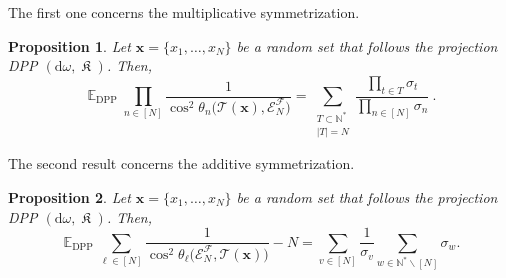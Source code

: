 \documentclass[twoside,11pt]{book}
\newtheorem{proposition}{Proposition}
\numberwithin{theorem}{chapter}
\numberwithin{definition}{chapter}
\numberwithin{proposition}{chapter}
\numberwithin{corollary}{chapter}
\numberwithin{example}{chapter}
\numberwithin{lemma}{chapter}
\numberwithin{assumption}{chapter}
\DeclareMathOperator{\Det}{Det}
\DeclareMathOperator{\DPP}{\mathrm{DPP}}
\DeclareMathOperator{\EX}{\mathbb{E}}
\DeclareMathOperator*{\KDPP}{\mathfrak{K}}
\begin{document}

The first one concerns the multiplicative symmetrization.
\begin{proposition}\label{prop:expected_value_of_product_of_cos}
Let $\bm{x} = \{x_{1}, \dots , x_{N}\}$ be a random set that follows the projection DPP $(\mathrm{d}\omega, \KDPP )$. Then,
\begin{equation}\label{eq:expected_value_of_product_of_cos}
\EX_{\DPP} \prod\limits_{n \in [N]} \frac{1}{\cos^{2} \theta_{n}\bigg(\mathcal{T}(\bm{x}), \mathcal{E}^{\mathcal{F}}_{N} \bigg)}   = \sum\limits_{\substack{T \subset \mathbb{N}^{*} \\ |T| = N}} \frac{ \prod\limits_{t \in T}\sigma_{t}}{\prod\limits_{n \in [N]} \sigma_{n}} \:.
\end{equation}
\end{proposition}

The second result concerns the additive symmetrization.

\begin{proposition}\label{prop:ex_dpp_sum_inv_cos}
Let $\bm{x} = \{x_{1}, \dots , x_{N}\}$ be a random set that follows the projection DPP $(\mathrm{d}\omega, \KDPP )$. Then,
\begin{equation}
\EX_{\DPP}  \sum\limits_{\ell \in [N]} \frac{1}{\cos^{2} \theta_{\ell} \bigg(\mathcal{E}^{\mathcal{F}}_{N}, \mathcal{T}(\bm{x}) \bigg)} -N =  \sum\limits_{v \in [N]} \frac{1}{\sigma_{v}} \sum\limits_{w \in \mathbb{N}^{*}\smallsetminus [N]} \sigma_{w}.
\end{equation}
\end{proposition}



\end{document}
